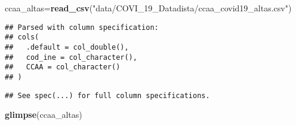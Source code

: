 \documentclass[
]{article}
\newenvironment{Shaded}{\begin{snugshade}}{\end{snugshade}}
\newcommand{\KeywordTok}[1]{\textcolor[rgb]{0.13,0.29,0.53}{\textbf{#1}}}
\newcommand{\NormalTok}[1]{#1}
\newcommand{\StringTok}[1]{\textcolor[rgb]{0.31,0.60,0.02}{#1}}
\begin{document}
\begin{Shaded}
\begin{Highlighting}[]
\NormalTok{ccaa_altas=}\KeywordTok{read_csv}\NormalTok{(}\StringTok{"data/COVI_19_Datadista/ccaa_covid19_altas.csv"}\NormalTok{)}
\end{Highlighting}
\end{Shaded}

\begin{verbatim}
## Parsed with column specification:
## cols(
##   .default = col_double(),
##   cod_ine = col_character(),
##   CCAA = col_character()
## )
\end{verbatim}

\begin{verbatim}
## See spec(...) for full column specifications.
\end{verbatim}

\begin{Shaded}
\begin{Highlighting}[]
\KeywordTok{glimpse}\NormalTok{(ccaa_altas)}
\end{Highlighting}
\end{Shaded}
\end{document}

